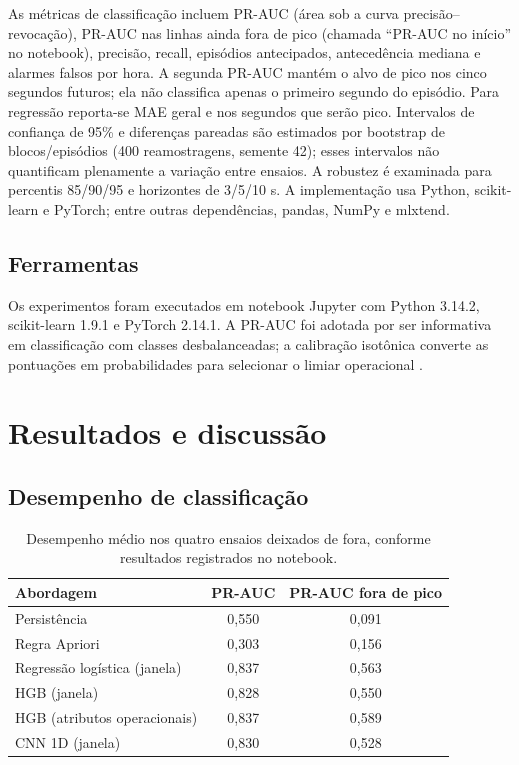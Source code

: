 \documentclass[10pt,a4paper]{article}
\begin{document}
As métricas de classificação incluem PR-AUC (área sob a curva precisão--revocação), PR-AUC nas linhas ainda fora de pico (chamada ``PR-AUC no início'' no notebook), precisão, recall, episódios antecipados, antecedência mediana e alarmes falsos por hora. A segunda PR-AUC mantém o alvo de pico nos cinco segundos futuros; ela não classifica apenas o primeiro segundo do episódio. Para regressão reporta-se MAE geral e nos segundos que serão pico. Intervalos de confiança de 95\% e diferenças pareadas são estimados por bootstrap de blocos/episódios (400 reamostragens, semente 42); esses intervalos não quantificam plenamente a variação entre ensaios. A robustez é examinada para percentis 85/90/95 e horizontes de 3/5/10 s. A implementação usa Python, scikit-learn e PyTorch; entre outras dependências, pandas, NumPy e mlxtend.

\subsection{Ferramentas}
Os experimentos foram executados em notebook Jupyter com Python 3.14.2, scikit-learn 1.9.1 e PyTorch 2.14.1. A PR-AUC foi adotada por ser informativa em classificação com classes desbalanceadas; a calibração isotônica converte as pontuações em probabilidades para selecionar o limiar operacional \cite{davis2006,niculescu2005}.

\section{Resultados e discussão}
\subsection{Desempenho de classificação}
\begin{table}[ht]
\centering
\small
\caption{Desempenho médio nos quatro ensaios deixados de fora, conforme resultados registrados no notebook.}
\begin{tabular}{lcc}
\toprule
Abordagem & PR-AUC & PR-AUC fora de pico \\
\midrule
Persistência & 0{,}550 & 0{,}091 \\
Regra Apriori & 0{,}303 & 0{,}156 \\
Regressão logística (janela) & 0{,}837 & 0{,}563 \\
HGB (janela) & 0{,}828 & 0{,}550 \\
HGB (atributos operacionais) & 0{,}837 & 0{,}589 \\
CNN 1D (janela) & 0{,}830 & 0{,}528 \\
\bottomrule
\end{tabular}
\end{table}
\end{document}
